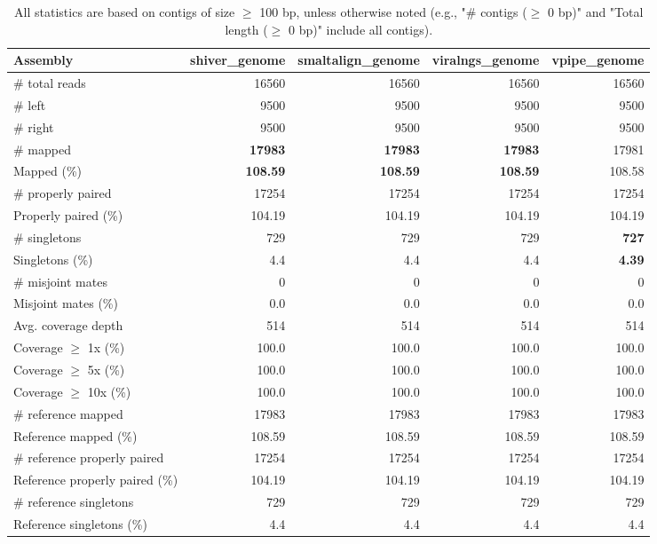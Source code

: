 \documentclass[12pt,a4paper]{article}
\begin{document}
\begin{table}[ht]
\begin{center}
\caption{All statistics are based on contigs of size $\geq$ 100 bp, unless otherwise noted (e.g., "\# contigs ($\geq$ 0 bp)" and "Total length ($\geq$ 0 bp)" include all contigs).}
\begin{tabular}{|l*{4}{|r}|}
\hline
Assembly & shiver\_genome & smaltalign\_genome & viralngs\_genome & vpipe\_genome \\ \hline
\# total reads & 16560 & 16560 & 16560 & 16560 \\ \hline
\# left & 9500 & 9500 & 9500 & 9500 \\ \hline
\# right & 9500 & 9500 & 9500 & 9500 \\ \hline
\# mapped & {\bf 17983} & {\bf 17983} & {\bf 17983} & 17981 \\ \hline
Mapped (\%) & {\bf 108.59} & {\bf 108.59} & {\bf 108.59} & 108.58 \\ \hline
\# properly paired & 17254 & 17254 & 17254 & 17254 \\ \hline
Properly paired (\%) & 104.19 & 104.19 & 104.19 & 104.19 \\ \hline
\# singletons & 729 & 729 & 729 & {\bf 727} \\ \hline
Singletons (\%) & 4.4 & 4.4 & 4.4 & {\bf 4.39} \\ \hline
\# misjoint mates & 0 & 0 & 0 & 0 \\ \hline
Misjoint mates (\%) & 0.0 & 0.0 & 0.0 & 0.0 \\ \hline
Avg. coverage depth & 514 & 514 & 514 & 514 \\ \hline
Coverage $\geq$ 1x (\%) & 100.0 & 100.0 & 100.0 & 100.0 \\ \hline
Coverage $\geq$ 5x (\%) & 100.0 & 100.0 & 100.0 & 100.0 \\ \hline
Coverage $\geq$ 10x (\%) & 100.0 & 100.0 & 100.0 & 100.0 \\ \hline
\# reference mapped & 17983 & 17983 & 17983 & 17983 \\ \hline
Reference mapped (\%) & 108.59 & 108.59 & 108.59 & 108.59 \\ \hline
\# reference properly paired & 17254 & 17254 & 17254 & 17254 \\ \hline
Reference properly paired (\%) & 104.19 & 104.19 & 104.19 & 104.19 \\ \hline
\# reference singletons & 729 & 729 & 729 & 729 \\ \hline
Reference singletons (\%) & 4.4 & 4.4 & 4.4 & 4.4 \\ \hline

\end{tabular}
\end{center}
\end{table}
\end{document}
